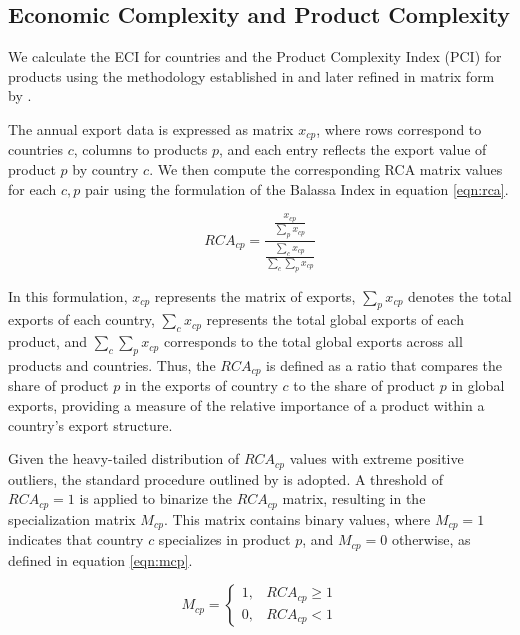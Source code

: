\documentclass[10pt]{article}
\begin{document}
\subsection{Economic Complexity and Product Complexity}
We calculate the ECI for countries and the Product Complexity Index (PCI) for products using the methodology established in \cite{hidalgoBuildingBlocksEconomic2009} and later refined in matrix form by \cite{mealyInterpretingEconomicComplexity2019}.

The annual export data is expressed as matrix $x_{cp}$, where rows correspond to countries $c$, columns to products $p$, and each entry reflects the export value of product $p$ by country $c$. We then compute the corresponding RCA matrix values for each $c,p$ pair using the formulation of the Balassa Index \citep{BalassaIndex} in equation \eqref{eqn:rca}.

\begin{equation}\label{eqn:rca}
 RCA_{cp} = \frac{\frac{x_{cp}}{\sum_{p}x_{cp}}}{\frac{\sum_{c}x_{cp}}{\sum_{c}\sum_{p}x_{cp}}}
\end{equation}

In this formulation, $x_{cp}$ represents the matrix of exports, $\sum_{p}x_{cp}$ denotes the total exports of each country, $\sum_{c}x_{cp}$ represents the total global exports of each product, and $\sum_{c}\sum_{p}x_{cp}$ corresponds to the total global exports across all products and countries. Thus, the $RCA_{cp}$ is defined as a ratio that compares the share of product $p$ in the exports of country $c$ to the share of product $p$ in global exports, providing a measure of the relative importance of a product within a country's export structure.

Given the heavy-tailed distribution of $RCA_{cp}$ values with extreme positive outliers, the standard procedure outlined by \cite{hidalgoEconomicComplexityTheory2021} is adopted. A threshold of $RCA_{cp} = 1$ is applied to binarize the $RCA_{cp}$ matrix, resulting in the specialization matrix $M_{cp}$. This matrix contains binary values, where $M_{cp} = 1$ indicates that country $c$ specializes in product $p$, and $M_{cp} = 0$ otherwise, as defined in equation \eqref{eqn:mcp}.

\begin{equation}\label{eqn:mcp}
 M_{cp} = \left\{\begin{matrix}
            1, & RCA_{cp} \geq 1\\ 
            0, & RCA_{cp} < 1
      \end{matrix}\right.
\end{equation}
\end{document}
